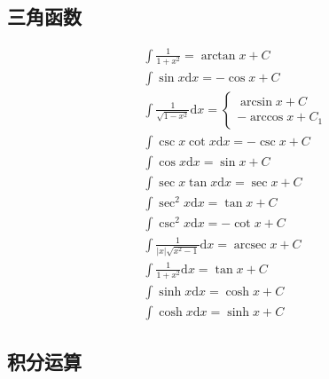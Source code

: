 \subsection{三角函数}
\begin{align}
&\int \frac{1}{1+x^2}=\arctan x + C\\
&\int\sin x \mathrm{d}{x} = -\cos x + C\\
&\int\frac{1}{\sqrt{1-x^2}}\mathrm{d}{x} =\begin{cases}
    \arcsin x + C\\
    -\arccos x +C_1
\end{cases}  \\
&\int\csc x\cot x \mathrm{d}{x} = -\csc x + C\\
&\int\cos x \mathrm{d}{x} = \sin x + C \\
&\int\sec x \tan x\mathrm{d}{x} = \sec x + C \\
&\int\sec^2 x\mathrm{d}{x} = \tan x + C \\
&\int\csc^2 x\mathrm{d}{x} = -\cot x +C \\
&\int\frac{1}{\left|x\right|\sqrt{x^2-1}}\mathrm{d}{x} = \operatorname{arcsec} x + C \\
&\int\frac{1}{1+x^2}\mathrm{d}{x} = \tan x + C\\
&\int\sinh x \mathrm{d}{x} = \cosh x + C\\
&\int\cosh x \mathrm{d}{x} = \sinh x + C
\end{align}
\subsection{积分运算}
